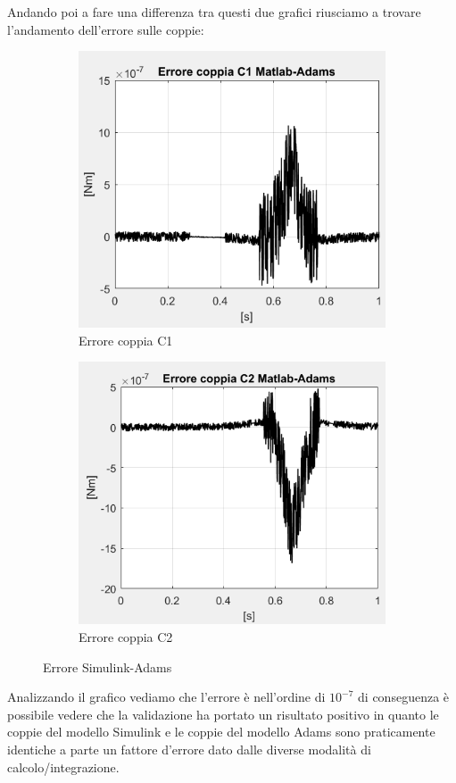 Andando poi a fare una differenza tra questi due grafici riusciamo a trovare l'andamento dell'errore sulle coppie:
\begin{figure}[!ht]
	\begin{subfigure}{.5\textwidth}
		\centering
		\includegraphics[width=.9\linewidth]{Immagini/Dinamica/confrc1.png}  
		\caption{Errore coppia C1}
		\label{fig:errC1}
	\end{subfigure}
	\begin{subfigure}{.5\textwidth}
		\centering
		\includegraphics[width=.9\linewidth]{Immagini/Dinamica/confrc2.png}  
		\caption{Errore coppia C2}
		\label{fig:errC2}
	\end{subfigure}
	\caption{Errore Simulink-Adams}
\end{figure}
Analizzando il grafico vediamo che l'errore è nell'ordine di $10^{-7}$ di conseguenza è possibile vedere che la validazione ha portato un risultato positivo in quanto le coppie del modello Simulink e le coppie del modello Adams sono praticamente identiche a parte un fattore d'errore dato dalle diverse modalità di calcolo/integrazione.
